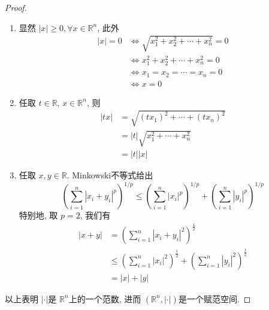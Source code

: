 \documentclass[../main.tex]{subfiles}
\begin{document}
\begin{proof}
    \begin{enumerate}
        \item 显然 \(  \left| x \right|\ge 0 ,\forall x\in \mathbb{R} ^{n}   \), 此外 \[
        \begin{aligned}
        \left| x \right|= 0&\iff \sqrt{x_1^{2}+ x_2^{2}+ \cdots + x_{n}^{2}}= 0\\ 
         &\iff x_1^{2}+ x_2^{2}+ \cdots + x_{n}^{2}= 0\\ 
          &\iff x_1= x_2= \cdots = x_{n}= 0\\ 
           &\iff x= 0  
        \end{aligned}
        \]
        \item 任取 \(  t\in \mathbb{R}   \), \(  x \in \mathbb{R} ^{n}  \), 则 \[
        \begin{aligned}
        \left| tx \right|&=  \sqrt{\left( tx_1 \right)^{2}+ \cdots + \left( tx_{n} \right)^{2}  }\\ 
         &= \left| t \right|\sqrt{x_1^{2}+ \cdots + x_{n}^{2}}\\ 
          &= \left| t \right|\left| x \right|     
        \end{aligned}
        \]
        \item 任取 \(  x,y \in \mathbb{R}   \).  Minkowski不等式给出 $$\left( \sum_{i=1}^n |x_i + y_i|^p \right)^{1/p} \le \left( \sum_{i=1}^n |x_i|^p \right)^{1/p} + \left( \sum_{i=1}^n |y_i|^p \right)^{1/p}$$ 特别地, 取 \(  p= 2  \), 我们有 \[
        \begin{aligned}
        \left| x+ y \right|&= \left( \sum _{i= 1}^{n}\left| x_{i}+ y_{i} \right|^{2}  \right)^{\frac{1}{2}}   \\ 
         &\le \left( \sum _{i= 1}^{n}\left| x_{i} \right|^{2}  \right)^{\frac{1}{2}}+ \left( \sum _{i= 1}^{n}\left| y_{i} \right|^{2}  \right)^{\frac{1}{2}}\\ 
          &= \left| x \right|+ \left| y \right|    
        \end{aligned}
        \] 
    \end{enumerate}
    以上表明 \(  \left| \cdot  \right|   \)是 \(  \mathbb{R} ^{n}  \)上的一个范数, 进而 \(  \left( \mathbb{R} ^{n},\left| \cdot  \right|  \right)   \)是一个赋范空间.   
\end{proof}
\end{document}
